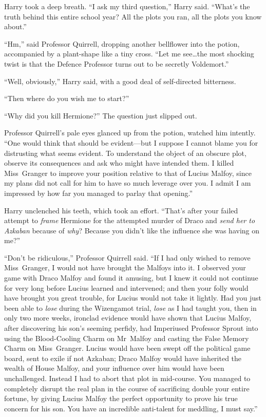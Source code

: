 Harry took a deep breath. “I ask my third question,” Harry said. “What’s the truth behind this entire school year? All the plots you ran, all the plots you know about.”

“Hm,” said Professor Quirrell, dropping another bellflower into the potion, accompanied by a plant-shape like a tiny cross. “Let me see…the most shocking twist is that the Defence Professor turns out to be secretly Voldemort.”

“Well, obviously,” Harry said, with a good deal of self-directed bitterness.

“Then where do you wish me to start?”

“Why did you kill Hermione?” The question just slipped out.

Professor Quirrell’s pale eyes glanced up from the potion, watched him intently. “One would think that should be evident—but I suppose I cannot blame you for distrusting what seems evident. To understand the object of an obscure plot, observe its consequences and ask who might have intended them. I killed Miss~Granger to improve your position relative to that of Lucius Malfoy, since my plans did not call for him to have so much leverage over you. I admit I am impressed by how far you managed to parlay that opening.”

Harry unclenched his teeth, which took an effort. “That’s after your failed attempt to \emph{frame} Hermione for the attempted murder of Draco and \emph{send her to Azkaban} because of \emph{why}? Because you didn’t like the influence she was having on me?”

“Don’t be ridiculous,” Professor Quirrell said. “If I had only wished to remove Miss~Granger, I would not have brought the Malfoys into it. I observed your game with Draco Malfoy and found it amusing, but I knew it could not continue for very long before Lucius learned and intervened; and then your folly would have brought you great trouble, for Lucius would not take it lightly. Had you just been able to \emph{lose} during the Wizengamot trial, \emph{lose} as I had taught you, then in only two more weeks, ironclad evidence would have shown that Lucius Malfoy, after discovering his son’s seeming perfidy, had Imperiused Professor Sprout into using the Blood-Cooling Charm on Mr~Malfoy and casting the False Memory Charm on Miss~Granger. Lucius would have been swept off the political game board, sent to exile if not Azkaban; Draco Malfoy would have inherited the wealth of House Malfoy, and your influence over him would have been unchallenged. Instead I had to abort that plot in mid-course. You managed to completely disrupt the real plan in the course of sacrificing double your entire fortune, by giving Lucius Malfoy the perfect opportunity to prove his true concern for his son. You have an incredible anti-talent for meddling, I must say.”

